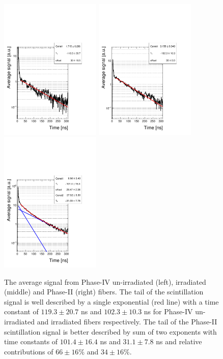 \documentclass[a4paper,11pt]{article}
\begin{document}
\begin{figure}[ht]
\begin{center}
      \includegraphics[width=4.8cm]{Figures/B5_R11864_fit_zoom_singleLog.pdf}
      \includegraphics[width=4.8cm]{Figures/B4_R11863_fit_zoom_singleLog.pdf}
      \includegraphics[width=4.8cm]{Figures/B1_R11862_fit_zoom_singleLog.pdf}
\caption{\small The average signal from Phase-IV un-irradiated (left), irradiated (middle) and Phase-II (right) fibers. The tail of the scintillation signal is well described by a single exponential (red line) with a time constant of $119.3 \pm 20.7$ ns and $102.3 \pm 10.3$ ns for Phase-IV un-irradiated and irradiated fibers respectively. The tail of the Phase-II scintillation signal is better described by sum of two exponents with time constants of $101.4 \pm 16.4$ ns and $31.1  \pm 7.8$ ns and relative contributions of $66 \pm 16 \%$ and $34 \pm 16 \%$.}
    \label{fig:phase4scintTime}
\end{center}
\end{figure}
\end{document}
